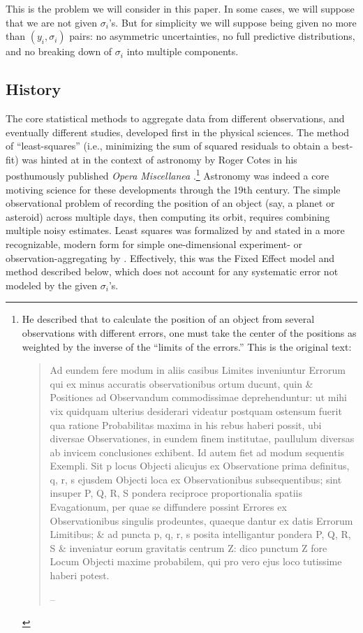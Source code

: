 \documentclass[12pt]{article}
\begin{document}
This is the problem we will consider in this paper. In some cases, we will suppose that we are not given $\sigma_i$'s. But for simplicity we will suppose being given no more than $(y_i,\sigma_i)$ pairs: no asymmetric uncertainties, no full predictive distributions, and no breaking down of $\sigma_i$ into multiple components.

\subsection{History}\label{sec:history}

The core statistical methods to aggregate data from different observations, and eventually different studies, developed first in the physical sciences. The method of ``least-squares'' (i.e., minimizing the sum of squared residuals to obtain a best-fit) was hinted at in the context of astronomy by Roger Cotes in his posthumously published \emph{Opera Miscellanea} \citeyearpar{cotes1722opera}.\footnote{He described that to calculate the position of an object from several observations with different errors, one must take the center of the positions as weighted by the inverse of the ``limits of the errors.'' This is the original text:
  \begin{quote}Ad eundem fere modum in aliis casibus Limites inveniuntur Errorum qui ex minus accuratis observationibus ortum ducunt, quin \& Positiones ad Observandum commodissimae deprehenduntur: ut mihi vix quidquam ulterius desiderari videatur postquam ostensum fuerit qua ratione Probabilitas maxima in his rebus haberi possit, ubi diversae Observationes, in eundem finem institutae, paullulum diversas ab invicem conclusiones exhibent. Id autem fiet ad modum sequentis Exempli. Sit p locus Objecti alicujus ex Observatione prima definitus, q, r, s ejusdem Objecti loca ex Observationibus subsequentibus; sint insuper P, Q, R, S pondera reciproce proportionalia spatiis Evagationum, per quae se diffundere possint Errores ex Observationibus singulis prodeuntes, quaeque dantur ex datis Errorum Limitibus; \& ad puncta p, q, r, s posita intelligantur pondera P, Q, R, S \& inveniatur eorum gravitatis centrum Z: dico punctum Z fore Locum Objecti maxime probabilem, qui pro vero ejus loco tutissime haberi potest.
  
  \hfill-- \citet[Aestimatio Errorum in Mixta Mathesi, pg. 22]{cotes1722opera}\end{quote}}
Astronomy was indeed a core motiving science for these developments through the 19th century. The simple observational problem of recording the position of an object (say, a planet or asteroid) across multiple days, then computing its orbit, requires combining multiple noisy estimates. Least squares was formalized by \citet[art. 179]{gauss1857theory} and stated in a more recognizable, modern form for simple one-dimensional experiment- or observation-aggregating by \citet[art. 69-71]{airy1861algebraical}. Effectively, this was the Fixed Effect model and method described below, which does not account for any systematic error not modeled by the given $\sigma_i$'s.
\end{document}
